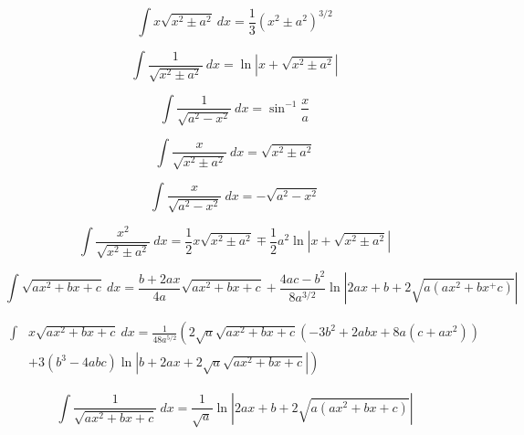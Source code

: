 \documentclass[12pt,a4paper,leqno]{article}
\begin{document}
   \begin{equation}
   \int  x \sqrt{x^2 \pm a^2}\ dx= \frac{1}{3}\left ( x^2 \pm a^2 \right)^{3/2}
   \end{equation}

   \begin{equation}
   \int \frac{1}{\sqrt{x^2 \pm a^2}}\ dx = \ln \left | x + \sqrt{x^2 \pm a^2} \right |
   \end{equation}

   \begin{equation}
   \int \frac{1}{\sqrt{a^2 - x^2}}\ dx = \sin^{-1}\frac{x}{a}
   \end{equation}

   \begin{equation}
   \int \frac{x}{\sqrt{x^2\pm a^2}}\ dx = \sqrt{x^2 \pm a^2}
   \end{equation}

   \begin{equation}
   \int \frac{x}{\sqrt{a^2-x^2}}\ dx = -\sqrt{a^2-x^2}
   \end{equation}

   \begin{equation}\label{eq:Russ}
   \int \frac{x^2}{\sqrt{x^2 \pm a^2}}\ dx = \frac{1}{2}x\sqrt{x^2 \pm a^2}
   \mp \frac{1}{2}a^2 \ln \left| x + \sqrt{x^2\pm a^2} \right |
   \end{equation}

   \begin{equation}\label{eq:Winokur1}
   \int \sqrt{a x^2 + b x + c}\ dx =
   \frac{b+2ax}{4a}\sqrt{ax^2+bx+c}
   +
   \frac{4ac-b^2}{8a^{3/2}}\ln \left| 2ax + b + 2\sqrt{a(ax^2+bx^+c)}\right |
   \end{equation}

   \begin{equation}\label{eq:Larry-Morris}\begin{split}
   \int &x \sqrt{a x^2 + bx + c}\ dx = \frac{1}{48a^{5/2}}\left (
   2 \sqrt{a} \sqrt{ax^2+bx+c}
   \right .
     \left( - 3b^2 + 2 abx + 8 a(c+ax^2) \right)
   \\ &  \left.
    + 3(b^3-4abc)\ln \left|b + 2ax + 2\sqrt{a}\sqrt{ax^2+bx+c} \right| \right)
    \end{split}
   \end{equation}

   \begin{equation}
   \int\frac{1}{\sqrt{ax^2+bx+c}}\ dx=
   \frac{1}{\sqrt{a}}\ln \left| 2ax+b + 2 \sqrt{a(ax^2+bx+c)} \right |
   \end{equation}
\end{document}
